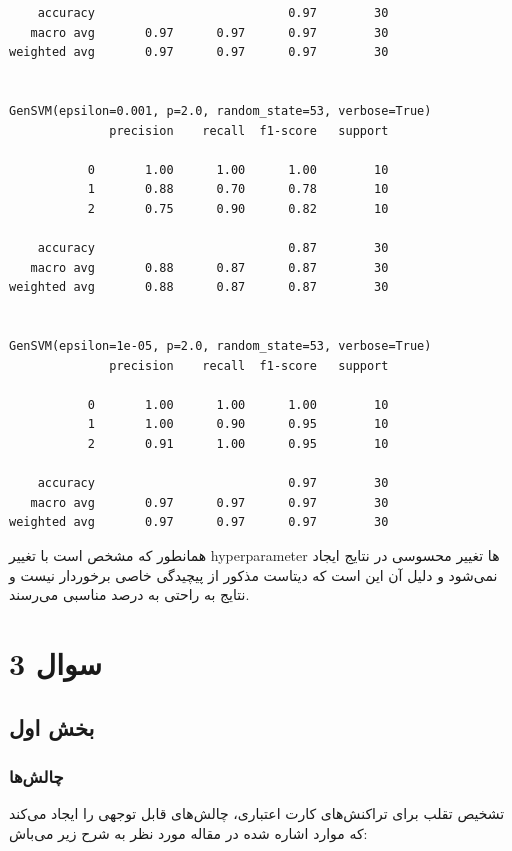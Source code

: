 \documentclass{article}
\begin{document}
\begin{LTR}
\begin{verbatim}
    accuracy                           0.97        30
   macro avg       0.97      0.97      0.97        30
weighted avg       0.97      0.97      0.97        30


GenSVM(epsilon=0.001, p=2.0, random_state=53, verbose=True)
              precision    recall  f1-score   support

           0       1.00      1.00      1.00        10
           1       0.88      0.70      0.78        10
           2       0.75      0.90      0.82        10

    accuracy                           0.87        30
   macro avg       0.88      0.87      0.87        30
weighted avg       0.88      0.87      0.87        30


GenSVM(epsilon=1e-05, p=2.0, random_state=53, verbose=True)
              precision    recall  f1-score   support

           0       1.00      1.00      1.00        10
           1       1.00      0.90      0.95        10
           2       0.91      1.00      0.95        10

    accuracy                           0.97        30
   macro avg       0.97      0.97      0.97        30
weighted avg       0.97      0.97      0.97        30
\end{verbatim}
\end{LTR}

همانطور که مشخص است با تغییر hyperparameter ها تغییر محسوسی در نتایج ایجاد نمی‌شود و دلیل آن این است که دیتاست مذکور از پیچیدگی خاصی برخوردار نیست و نتایج به راحتی به درصد مناسبی می‌رسند.

\section{سوال 3}

\subsection{بخش اول}
\subsubsection{ چالش‌ها}

تشخیص تقلب برای تراکنش‌های کارت اعتباری، چالش‌های قابل توجهی را ایجاد می‌کند که موارد اشاره شده در مقاله مورد نظر به شرح زیر می‌باش:
\end{document}
